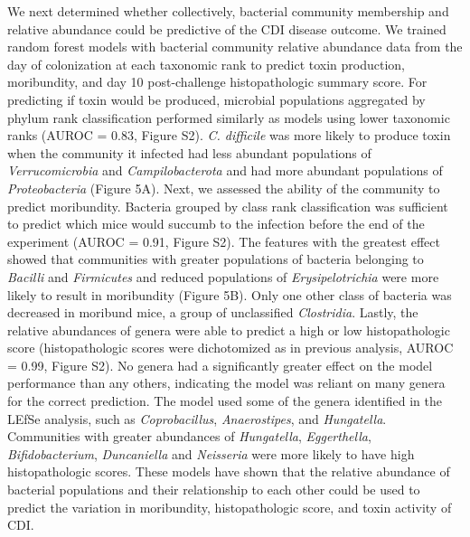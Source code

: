 \documentclass[
  12pt,
]{article}
\begin{document}
We next determined whether collectively, bacterial community membership
and relative abundance could be predictive of the CDI disease outcome.
We trained random forest models with bacterial community relative
abundance data from the day of colonization at each taxonomic rank to
predict toxin production, moribundity, and day 10 post-challenge
histopathologic summary score. For predicting if toxin would be
produced, microbial populations aggregated by phylum rank classification
performed similarly as models using lower taxonomic ranks (AUROC = 0.83,
Figure S2). \emph{C. difficile} was more likely to produce toxin when
the community it infected had less abundant populations of
\emph{Verrucomicrobia} and \emph{Campilobacterota} and had more abundant
populations of \emph{Proteobacteria} (Figure 5A). Next, we assessed the
ability of the community to predict moribundity. Bacteria grouped by
class rank classification was sufficient to predict which mice would
succumb to the infection before the end of the experiment (AUROC = 0.91,
Figure S2). The features with the greatest effect showed that
communities with greater populations of bacteria belonging to
\emph{Bacilli} and \emph{Firmicutes} and reduced populations of
\emph{Erysipelotrichia} were more likely to result in moribundity
(Figure 5B). Only one other class of bacteria was decreased in moribund
mice, a group of unclassified \emph{Clostridia}. Lastly, the relative
abundances of genera were able to predict a high or low histopathologic
score (histopathologic scores were dichotomized as in previous analysis,
AUROC = 0.99, Figure S2). No genera had a significantly greater effect
on the model performance than any others, indicating the model was
reliant on many genera for the correct prediction. The model used some
of the genera identified in the LEfSe analysis, such as
\emph{Coprobacillus}, \emph{Anaerostipes}, and \emph{Hungatella}.
Communities with greater abundances of \emph{Hungatella},
\emph{Eggerthella}, \emph{Bifidobacterium}, \emph{Duncaniella} and
\emph{Neisseria} were more likely to have high histopathologic scores.
These models have shown that the relative abundance of bacterial
populations and their relationship to each other could be used to
predict the variation in moribundity, histopathologic score, and toxin
activity of CDI.
\end{document}
